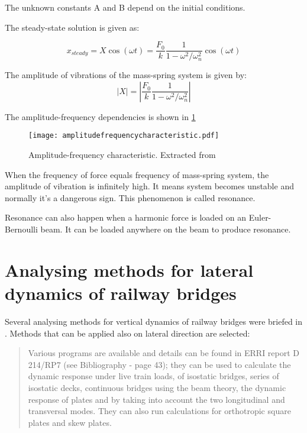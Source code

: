 \begin{appendices}
The unknown constants A and B depend on the initial conditions.

The steady-state solution is given as:

\begin{equation}
	x_{steady}= X \cos(\omega t) = \frac{F_0}{k}\frac{1}{1-\omega^2/\omega_n^2}\cos(\omega t)
\end{equation}

The amplitude of vibrations of the mass-spring system is given by:
\begin{equation}
	|X|=|\frac{F_0}{k}\frac{1}{1-\omega^2/\omega_n^2}|
\end{equation}

The amplitude-frequency dependencies is shown in \ref{fig:amplitude-frequency-characteristic} 

\begin{figure}[h]
	\centering
	\texttt{[image: amplitudefrequencycharacteristic.pdf]}
	\caption{Amplitude-frequency characteristic. Extracted from \citet[2.2.2]{dynamicslecturenote}}
	\label{fig:amplitude-frequency-characteristic}
\end{figure}

When the frequency of force equals frequency of mass-spring system, the amplitude of vibration is infinitely high. It means system becomes unstable and normally it's a dangerous sign. This phenomenon is called resonance.

Resonance can also happen when a harmonic force is loaded on an Euler-Bernoulli beam. It can be loaded anywhere on the beam to produce resonance. 


\section{Analysing methods for lateral dynamics of railway bridges }

Several analysing methods for vertical dynamics of railway bridges were briefed in \citet[A6.2]{UIC776-2}. Methods that can be applied also on lateral direction are selected:

\begin{quote}

Various programs are available and details can be found in ERRI report D 214/RP7 (see Bibliography - page 43); they can be used to calculate the dynamic response under live train loads, of isostatic bridges, series of isostatic decks, continuous bridges using the beam theory, the dynamic response of plates and by taking into account the two longitudinal and transversal modes. They can also run calculations for orthotropic square plates and skew plates.


\end{quote}
\end{appendices}
